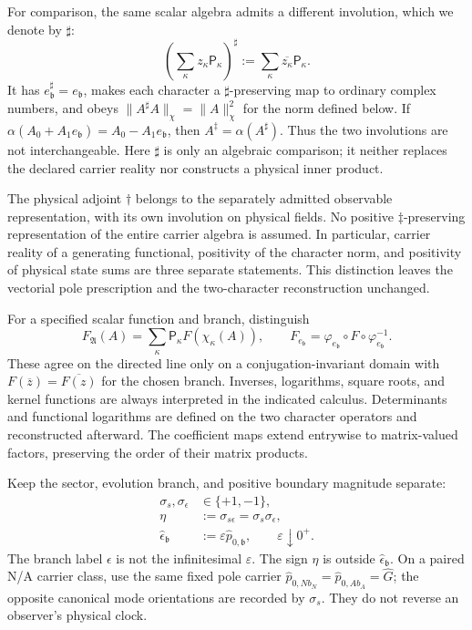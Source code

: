 \documentclass[final,5p,times,twocolumn,numbers,nopreprintline]{elsarticle}
\numberwithin{equation}{section}
\theoremstyle{definition}
\theoremstyle{remark}
\newcommand{\bb}{\mathfrak b}
\newcommand{\ee}{e_{\bb}}
\newcommand{\epsvec}{\hat\epsilon_{\bb}}
\newcommand{\embed}{\varphi_{\ee}}
\begin{document}
For comparison, the same scalar algebra admits a different involution,
which we denote by \(\sharp\):
\begin{equation}
 \left(\sum_\kappa z_\kappa\mathsf P_\kappa\right)^\sharp
      :=\sum_\kappa\overline{z_\kappa}\mathsf P_\kappa.
 \label{eq:coefficient-positive-involution}
\end{equation}
It has \(\ee^\sharp=\ee\), makes each character a
\(\sharp\)-preserving map to ordinary complex numbers, and obeys
\(\|A^\sharp A\|_\chi=\|A\|_\chi^2\) for the norm defined
below. If \(\alpha(A_0+A_1\ee)=A_0-A_1\ee\), then
\(A^\ddagger=\alpha(A^\sharp)\). Thus the two involutions
are not interchangeable. Here \(\sharp\) is only an algebraic
comparison; it neither replaces the declared carrier reality nor
constructs a physical inner product.

The physical adjoint \(\dagger\) belongs to the separately admitted
observable representation, with its own involution on physical fields. No positive \(\ddagger\)-preserving
representation of the entire carrier algebra is assumed. In particular,
carrier reality of a generating functional, positivity of the
character norm, and positivity of physical state sums are three
separate statements. This distinction leaves the vectorial pole
prescription and the two-character reconstruction unchanged.

For a specified scalar function and branch, distinguish
\begin{equation}
 F_{\mathfrak A}(A)
   =\sum_\kappa\mathsf P_\kappa F(\chi_\kappa(A)),
 \qquad
 F_{\ee}=\embed\circ F\circ\embed^{-1}.
 \label{eq:carrier-functional-calculus}
\end{equation}
These agree on the directed line only on a conjugation-invariant
domain with \(F(\overline z)=\overline{F(z)}\) for the chosen
branch. Inverses, logarithms, square roots, and kernel functions are
always interpreted in the indicated calculus. Determinants and
functional logarithms are defined on the two character operators and
reconstructed afterward. The coefficient maps extend entrywise to
matrix-valued factors, preserving the order of their matrix products.

Keep the sector, evolution branch, and positive boundary magnitude
separate:
\begin{equation}
\begin{aligned}
 \sigma_s,\sigma_\epsilon&\in\{+1,-1\},\\
 \eta&:=\sigma_{s\epsilon}=\sigma_s\sigma_\epsilon,\\
 \epsvec&:=\varepsilon\hat p_{0,\bb},\qquad\varepsilon\downarrow0^+.
\end{aligned}
 \label{eq:signs}
\end{equation}
The branch label \(\epsilon\) is not the infinitesimal
\(\varepsilon\). The sign \(\eta\) is outside \(\epsvec\).
On a paired N/A carrier class, use the same fixed pole carrier
\(\hat p_{0,Nb_N}=\hat p_{0,Ab_A}=\hat G\); the opposite
canonical mode orientations are recorded by \(\sigma_s\).
They do not reverse an observer's physical clock.
\end{document}
